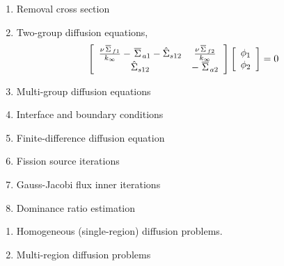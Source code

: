 \documentclass{school-22.211-notes}
\begin{document}
\begin{enumerate}
\item Removal cross section

\item Two-group diffusion equations,
  \begin{align}
    \left[ \begin{array}{cc} 
        \frac{\nu \left.\overline{\Sigma} \right._{f1}}{\left. k_{\infty} \right.} -  \left.\overline{\Sigma} \right._{a1}  - \hat{\Sigma}_{s12} & \frac{\nu \left.\overline{\Sigma} \right._{f2}}{\left. k_{\infty} \right.}   \\
        \hat{\Sigma}_{s12} &  - \left.\overline{\Sigma} \right._{a2}  
      \end{array} \right] 
    \left[ \begin{array}{c} \phi_1 \\ \phi_2 \end{array} \right] = 0
  \end{align}

\item Multi-group diffusion equations
\item Interface and boundary conditions
\item Finite-difference diffusion equation
\item Fission source iterations
\item Gauss-Jacobi flux inner iterations
\item Dominance ratio estimation
\end{enumerate}

\clearpage
{}
\begin{enumerate}
\item Homogeneous (single-region) diffusion problems.
\item Multi-region diffusion problems

\end{enumerate}
\end{document}
